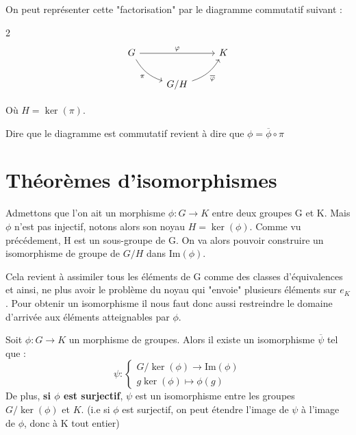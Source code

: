 On peut représenter cette "factorisation" par le diagramme commutatif suivant :

\begin{multicols}{2}
	\[
		\begin{tikzcd}
			G \arrow[rr, "\phi"] \arrow[dr, "\pi" swap, bend right=20] & & K \\
			& G/H \arrow[ur, "\overline{\phi}" swap, bend right=20] &
		\end{tikzcd}
	\]

	Où $H = \ker(\pi)$. 

	\vspace{0.3cm}

	Dire que le diagramme est commutatif revient à dire que $\phi = \overline{\phi} \circ \pi$

\end{multicols}


\section{Théorèmes d'isomorphismes}

Admettons que l'on ait un morphisme $\phi : G \longrightarrow K$ entre deux groupes G et K. 
Mais $\phi$ n'est pas injectif, notons alors son noyau $H = \ker(\phi)$. Comme vu précédement, 
H est un sous-groupe de G. On va alors pouvoir construire un isomorphisme de groupe de $G/H$ dans Im$(\phi)$. 

\vspace{0.5cm}

Cela revient à assimiler tous les éléments de G comme des classes d'équivalences et ainsi, ne plus avoir le problème 
du noyau qui "envoie" plusieurs éléments sur $e_K$. 
Pour obtenir un isomorphisme il nous faut donc aussi restreindre le domaine d'arrivée aux éléments atteignables par $\phi$. 

\begin{theorem}
	Soit $\phi : G \longrightarrow K$ un morphisme de groupes. Alors il existe un isomorphisme $\overline{\psi}$ tel que :
	\[ \psi : 
		\begin{cases}
			G/\ker(\phi) \longrightarrow \text{Im}(\phi) \\ 
			g\ker(\phi) \longmapsto \phi(g)
		\end{cases}
	\]
	De plus, \textbf{si $\phi$ est surjectif}, $\psi$ est un isomorphisme entre les groupes $G/\ker(\phi)$ et $K$.
	(i.e si $\phi$ est surjectif, on peut étendre l'image de $\psi$ à l'image de $\phi$, donc à K tout entier)
\end{theorem}

